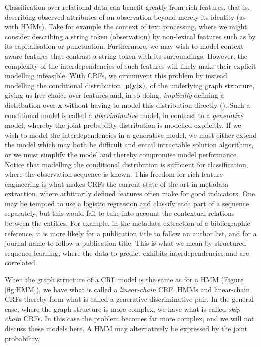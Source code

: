 Classification over relational data can benefit greatly from rich features, that is, describing observed attributes of an observation beyond merely its identity (as with HMMs). Take for example the context of text processing, where we might consider describing a string token (observation) by non-lexical features such as by its capitalisation or punctuation. Furthermore, we may wish to model context-aware features that contrast a string token with its surroundings. However, the complexity of the interdependencies of such features will likely make their explicit modelling infeasible. With CRFs, we circumvent this problem by instead modelling the conditional distribution, $\text{p}(\mathbf{y}|\mathbf{x})$, of the underlying graph structure, giving us free choice over features and, in so doing, \emph{implicitly} defining a distribution over $\mathbf{x}$ without having to model this distribution directly (\cite{sutton2006introduction}). Such a conditional model is called a \emph{discriminative} model, in contrast to a \emph{generative} model, whereby the joint probability distribution is modelled explicitly. If we wish to model the interdependencies in a generative model, we must either extend the model which may both be difficult and entail intractable solution algorithms, or we must simplify the model and thereby compromise model performance. Notice that modelling the conditional distribution is sufficient for classification, where the observation sequence is known. This freedom for rich feature engineering is what makes CRFs the current state-of-the-art in metadata extraction, where arbitrarily defined features often make for good indicators. One may be tempted to use a logistic regression and classify each part of a sequence separately, but this would fail to take into account the contextual relations between the entities. For example, in the metadata extraction of a bibliographic reference, it is more likely for a publication title to follow an author list, and for a journal name to follow a publication title. This is what we mean by structured sequence learning, where the data to predict exhibits interdependencies and are correlated.

When the graph structure of a CRF model is the same as for a HMM (Figure \ref{fig:HMM}), we have what is called a \emph{linear-chain} CRF. HMMs and linear-chain CRFs thereby form what is called a generative-discriminative pair. In the general case, where the graph structure is more complex, we have what is called \emph{skip-chain} CRFs. In this case the problem becomes far more complex, and we will not discuss these models here. A HMM may alternatively be expressed by the joint probability,

